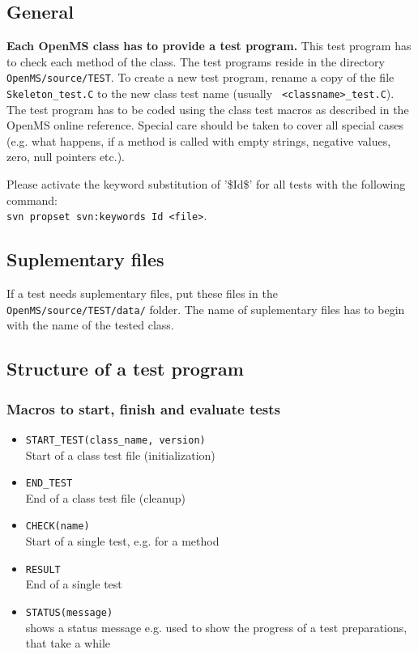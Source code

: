 \documentclass[a4]{article}
\begin{document}
\subsection{General}

{\bf Each OpenMS class has to provide a test program.} This test program has to check
each method of the class. The test programs reside in the directory
{\tt OpenMS/source/TEST}. To create a new test program, rename a copy of the file
{\tt Skeleton\_test.C} to the new class test name (usually {\tt
<classname>\_test.C}). The test program has to be coded using the class test
macros as described in the OpenMS online reference. Special care should be taken
to cover all special cases (e.g. what happens, if a method is called with
empty strings, negative values, zero, null pointers etc.).

Please activate the keyword substitution of '\$Id\$' for all tests with the following command:\\
{\tt svn propset svn:keywords Id <file>}.

\subsection{Suplementary files}
If a test needs suplementary files, put these files in the {\tt OpenMS/source/TEST/data/} folder.
The name of suplementary files has to begin with the name of the tested class.

\subsection{Structure of a test program}

\subsubsection{Macros to start, finish and evaluate tests}
\begin{itemize}
        \item {\tt START\_TEST(class\_name, version)} \\ Start of a class test file (initialization)
        \item {\tt END\_TEST} \\ End of a class test file (cleanup)
        \item {\tt CHECK(name)} \\ Start of a single test, e.g. for a method
        \item {\tt RESULT} \\ End of a single test
        \item {\tt STATUS(message)} \\ shows a status message e.g. used to show the progress of a test preparations, that take a while
\end{itemize}
\end{document}
